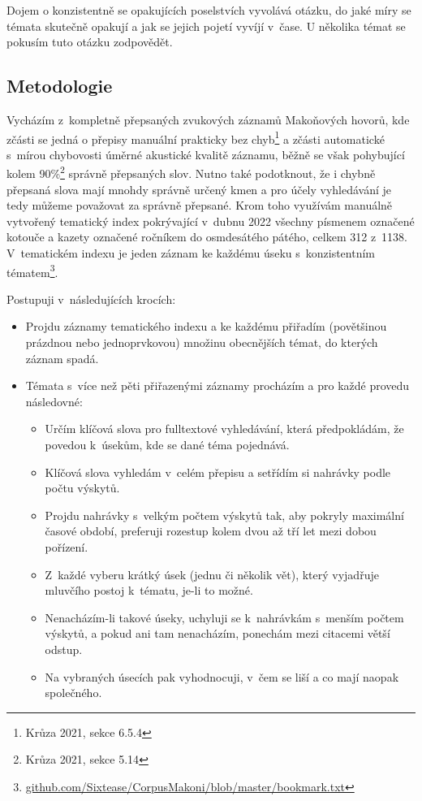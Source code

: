 Dojem o konzistentně se opakujících poselstvích vyvolává otázku, do jaké míry se
témata skutečně opakují a jak se jejich pojetí vyvíjí v~čase. U několika témat
se pokusím tuto otázku zodpovědět.

\subsection{Metodologie}

Vycházím z~kompletně přepsaných zvukových záznamů Makoňových hovorů, kde zčásti
se jedná o přepisy manuální prakticky bez chyb\footnote{Krůza 2021, sekce 6.5.4} a zčásti automatické s~mírou
chybovosti úměrné akustické kvalitě záznamu, běžně se však pohybující kolem
90\%\footnote{Krůza 2021, sekce 5.14}
správně přepsaných slov. Nutno také podotknout, že i chybně přepsaná slova mají
mnohdy správně určený kmen a pro účely vyhledávání je tedy můžeme považovat za
správně přepsané. Krom toho využívám manuálně vytvořený tematický index
pokrývající v~dubnu 2022 všechny písmenem označené kotouče a kazety označené
ročníkem do osmdesátého pátého, celkem 312 z~1138. V~tematickém indexu je jeden
záznam ke každému úseku s~konzistentním tématem\footnote{\href{https://github.com/Sixtease/CorpusMakoni/blob/master/bookmark.txt}{github.com/Sixtease/CorpusMakoni/blob/master/bookmark.txt}}.

Postupuji v~následujících krocích:
\begin{itemize}
\item{
Projdu záznamy tematického indexu a ke každému přiřadím (povětšinou prázdnou nebo jednoprvkovou) množinu
obecnějších témat, do kterých záznam spadá.
}
\item{
Témata s~více než pěti přiřazenými záznamy procházím a pro každé provedu
následovné:
\begin{itemize}
\item{
Určím klíčová slova pro fulltextové vyhledávání, která předpokládám, že povedou
k~úsekům, kde se dané téma pojednává.
}
\item{
Klíčová slova vyhledám v~celém přepisu a setřídím si nahrávky podle počtu
výskytů.
}
\item{
Projdu nahrávky s~velkým počtem výskytů tak, aby pokryly maximální časové
období, preferuji rozestup kolem dvou až tří let mezi dobou pořízení.
}
\item{
Z~každé vyberu krátký úsek (jednu či několik vět), který vyjadřuje mluvčího
postoj k~tématu, je-li to možné.
}
\item{
Nenacházím-li takové úseky, uchyluji se k~nahrávkám s~menším počtem výskytů, a
pokud ani tam nenacházím, ponechám mezi citacemi větší odstup.
}
\item{
Na vybraných úsecích pak vyhodnocuji, v~čem se liší a co mají naopak
společného.
}
\end{itemize}
}
\end{itemize}


